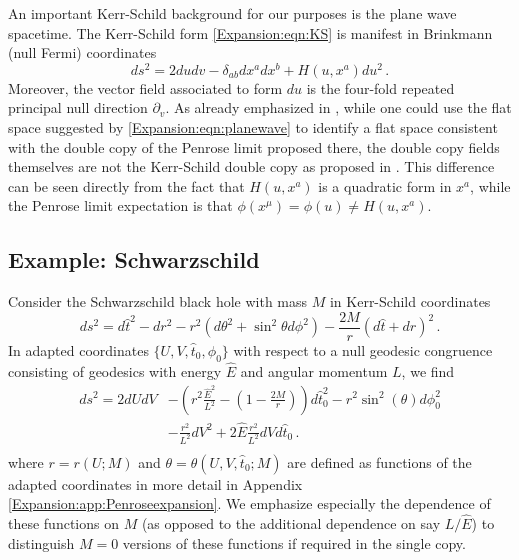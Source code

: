 An important Kerr-Schild background for our purposes is the plane wave spacetime. The Kerr-Schild form \eqref{Expansion:eqn:KS} is manifest in Brinkmann (null Fermi) coordinates
\begin{equation}\label{Expansion:eqn:planewave}
ds^2 = 2du dv - \delta_{ab}dx^a dx^b + H(u,x^a) du^2 \, .
\end{equation}
Moreover, the vector field associated to form $du$ is the four-fold repeated principal null direction $\partial_v$. As already emphasized in \cite{Chawla:2024mse}, while one could use the flat space suggested by \eqref{Expansion:eqn:planewave} to identify a flat space consistent with the double copy of the Penrose limit proposed there, the double copy fields themselves are not the Kerr-Schild double copy as proposed in \cite{Monteiro:2014cda}. This difference can be seen directly from the fact that $H(u,x^a)$ is a quadratic form in $x^a$, while the Penrose limit expectation is that $\phi(x^{\mu}) = \phi(u) \neq  H(u,x^a)$.

\subsection{Example: Schwarzschild}\label{Expansion:sec:example:Schwarzschild}

Consider the Schwarzschild black hole with mass $M$ in Kerr-Schild coordinates
\begin{equation}\label{Expansion:eqn:SmetricKS}
ds^2 = d\hat{t}^2- dr^2-r^2 \left(d\theta^2 + \sin^2\theta d \phi^2\right) -\frac{2M}{r}(d\hat{t} + dr)^2  \, .
\end{equation}
In adapted coordinates $\lbrace U,V,\hat{t}_0,\phi_0 \rbrace$ with respect to a null geodesic congruence consisting of geodesics with energy $\hat{E}$ and angular momentum $L$, we find
\begin{equation}\label{Expansion:eqn:Sadapted}
\begin{aligned}
ds^2 =  
2 dU dV&- \left(r^2 \frac{\hat{E}^2}{L^2}-\left(1-\frac{2M}{r}\right)\right)d\hat{t}_0^2 - r^2 \sin^2(\theta) d \phi_0^2  \\ &-\frac{r^2}{L^2} dV^2+2\hat{E} \frac{r^2}{L^2} dV d\hat{t}_0 \, .\\
\end{aligned}
\end{equation}
where $r = r(U;M)$ and $\theta = \theta(U,V,\hat{t}_0;M)$ are defined as functions of the adapted coordinates in more detail in Appendix \ref{Expansion:app:Penroseexpansion}. We emphasize especially the dependence of these functions on $M$ (as opposed to the additional dependence on say $L/\hat{E}$) to distinguish $M=0$ versions of these functions if required in the single copy. 

